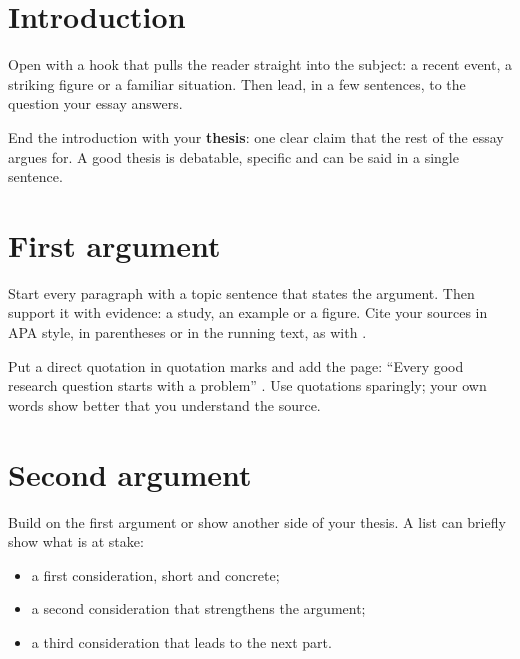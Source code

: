 \documentclass[11pt, a4paper]{article}
\begin{document}
\makeheader

\section{Introduction}
Open with a hook that pulls the reader straight into the subject: a
recent event, a striking figure or a familiar situation. Then lead, in a
few sentences, to the question your essay answers.

End the introduction with your \textbf{thesis}: one clear claim that the
rest of the essay argues for. A good thesis is debatable, specific and
can be said in a single sentence.

\section{First argument}
Start every paragraph with a topic sentence that states the argument.
Then support it with evidence: a study, an example or a figure. Cite your
sources in APA style, in parentheses \parencite{apa2020} or in the
running text, as with \textcite{booth2016}.

Put a direct quotation in quotation marks and add the page:
\enquote{Every good research question starts with a problem}
\parencite[p.~51]{lastname2024}. Use quotations sparingly; your own
words show better that you understand the source.

\section{Second argument}
Build on the first argument or show another side of your thesis. A list
can briefly show what is at stake:

\begin{itemize}
  \item a first consideration, short and concrete;
  \item a second consideration that strengthens the argument;
  \item a third consideration that leads to the next part.
\end{itemize}
\end{document}
